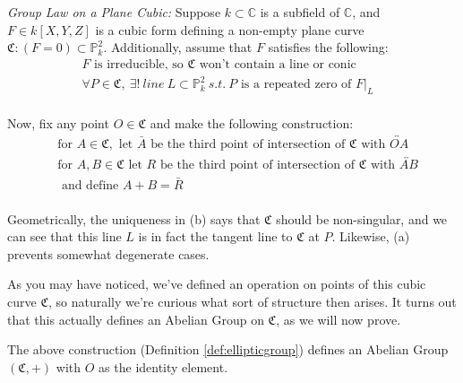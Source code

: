 \begin{mydef}
\label{def:ellipticgroup}
\emph{Group Law on a Plane Cubic:}
Suppose $k \subset \mathbb{C}$ is a subfield of $\mathbb{C}$,
and $F \in k[X,Y,Z]$ is a cubic form defining a non-empty plane
curve $\mathfrak{C}:(F=0) \subset \mathbb{P}^2_k$. Additionally, assume that
$F$ satisfies the following:
\begin{align*}
F \text{ is irreducible, so $\mathfrak{C}$ won't contain a line or conic}&\tag{a}\\
\forall P \in \mathfrak{C},~\exists!~line~L \subset \mathbb{P}^2_k~s.t.~ P
\text{ is a repeated zero of } F|_L& \tag{b}\\
\end{align*}

Now, fix any point $O \in \mathfrak{C}$ and make the following construction:
\begin{align*}
&\text{for } A \in \mathfrak{C}, \text{ let } \bar{A} \text{ be the third point of intersection of $\mathfrak{C}$ with $\overleftrightarrow{OA}$} \tag{i}\\
&\text{for } A, B \in \mathfrak{C} \text{ let } R \text{ be the third point of intersection of $\mathfrak{C}$ with $\overleftrightarrow{AB}$}\\
&\text{ and define $A+B = \bar{R}$}\tag{ii}\\
\end{align*}
\end{mydef}

Geometrically, the uniqueness in (b) says that $\mathfrak{C}$ should be non-singular,
and we can see that this line $L$ is in fact the tangent line to $\mathfrak{C}$ at $P$.
Likewise, (a) prevents somewhat degenerate cases.

As you may have noticed, we've defined an operation on points of this
cubic curve $\mathfrak{C}$, so naturally we're curious what sort of structure then
arises. It turns out that this actually defines an Abelian Group on $\mathfrak{C}$,
as we will now prove.

\begin{theorem}
The above construction (Definition \ref{def:ellipticgroup}) defines
an Abelian Group $(\mathfrak{C},+)$ with $O$ as the identity element.
\end{theorem}

